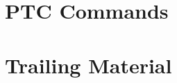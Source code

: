 \documentclass[11pt,a4paper,twoside]{report}
\begin{document}
\part{PTC Commands}


\part{Trailing Material}






%

%
%

%

%
%

%

%

\end{document}
